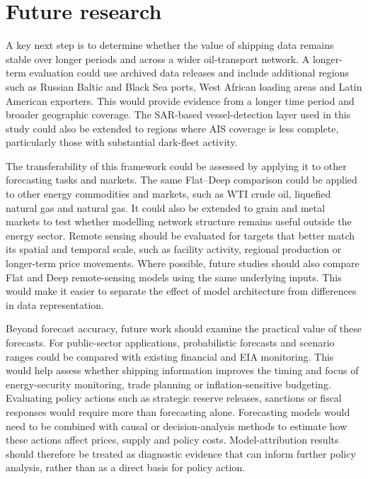 \documentclass[
  british,
  12pt,
  oneside]{book}
\begin{document}
\section{Future research}\label{discussion-future}

A key next step is to determine whether the value of shipping data remains stable over longer periods and across a wider oil-transport network. A longer-term evaluation could use archived data releases and include additional regions such as Russian Baltic and Black Sea ports, West African loading areas and Latin American exporters. This would provide evidence from a longer time period and broader geographic coverage. The SAR-based vessel-detection layer used in this study could also be extended to regions where AIS coverage is less complete, particularly those with substantial dark-fleet activity.

The transferability of this framework could be assessed by applying it to other forecasting tasks and markets. The same Flat--Deep comparison could be applied to other energy commodities and markets, such as WTI crude oil, liquefied natural gas and natural gas. It could also be extended to grain and metal markets to test whether modelling network structure remains useful outside the energy sector. Remote sensing should be evaluated for targets that better match its spatial and temporal scale, such as facility activity, regional production or longer-term price movements. Where possible, future studies should also compare Flat and Deep remote-sensing models using the same underlying inputs. This would make it easier to separate the effect of model architecture from differences in data representation.

Beyond forecast accuracy, future work should examine the practical value of these forecasts. For public-sector applications, probabilistic forecasts and scenario ranges could be compared with existing financial and EIA monitoring. This would help assess whether shipping information improves the timing and focus of energy-security monitoring, trade planning or inflation-sensitive budgeting. Evaluating policy actions such as strategic reserve releases, sanctions or fiscal responses would require more than forecasting alone. Forecasting models would need to be combined with causal or decision-analysis methods to estimate how these actions affect prices, supply and policy costs. Model-attribution results should therefore be treated as diagnostic evidence that can inform further policy analysis, rather than as a direct basis for policy action.
\end{document}
